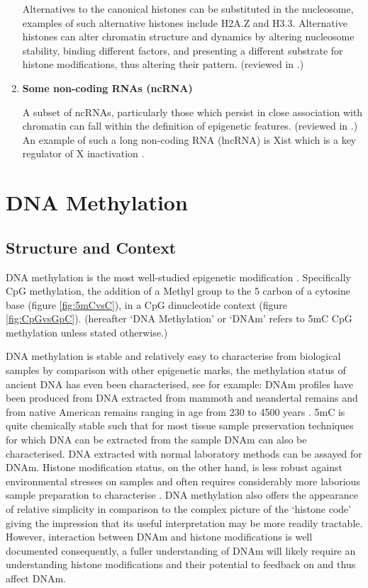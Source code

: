 \documentclass[
]{book}
\begin{document}
\begin{enumerate}
  Alternatives to the canonical histones can be substituted in the nucleosome, examples of such alternative histones include H2A.Z and H3.3. Alternative histones can alter chromatin structure and dynamics by altering nucleosome stability, binding different factors, and presenting a different substrate for histone modifications, thus altering their pattern. (reviewed in \citet{Weber2014}.)
\item
  \textbf{Some non-coding RNAs (ncRNA)}

  A subset of ncRNAs, particularly those which persist in close association with chromatin can fall within the definition of epigenetic features. (reviewed in \citet{Kaikkonen2011}.) An example of such a long non-coding RNA (lncRNA) is Xist which is a key regulator of X inactivation \citep{Cerase2015}.
\end{enumerate}

\hypertarget{dna-methylation}{%
\section{DNA Methylation}\label{dna-methylation}}

\hypertarget{structure-and-context}{%
\subsection{Structure and Context}\label{structure-and-context}}

DNA methylation is the most well-studied epigenetic modification \citep{Haluskova2010}. Specifically CpG methylation, the addition of a Methyl group to the 5 carbon of a cytosine base (figure \ref{fig:5mCvsC}), in a CpG dinucleotide context (figure \ref{fig:CpGvsGpC}). (hereafter `DNA Methylation' or `DNAm' refers to 5mC CpG methylation unless stated otherwise.)

DNA methylation is stable and relatively easy to characterise from biological samples by comparison with other epigenetic marks, the methylation status of ancient DNA has even been characterised, see for example: DNAm profiles have been produced from DNA extracted from mammoth and neandertal remains \citep{Briggs2010} and from native American remains ranging in age from 230 to 4500 years \citep{Smith2015}. 5mC is quite chemically stable such that for most tissue sample preservation techniques for which DNA can be extracted from the sample DNAm can also be characterised. DNA extracted with normal laboratory methods can be assayed for DNAm. Histone modification status, on the other hand, is less robust against environmental stresses on samples and often requires considerably more laborious sample preparation to characterise \citep{Bauden2017}. DNA methylation also offers the appearance of relative simplicity in comparison to the complex picture of the `histone code' giving the impression that its useful interpretation may be more readily tractable. However, interaction between DNAm and histone modifications is well documented \citep[\citet{Esteve2006},\citet{Rose2014}]{Hashimshony2003} consequently, a fuller understanding of DNAm will likely require an understanding histone modifications and their potential to feedback on and thus affect DNAm.
\end{document}
